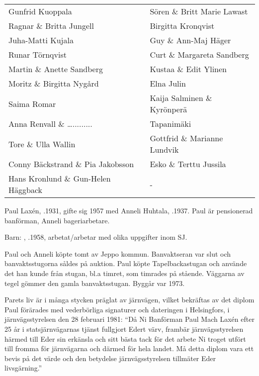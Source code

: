 \begin{center}
\begin{longtable}{l l}
    Gunfrid Kuoppala & Sören \& Britt Marie Lawast \\
    Ragnar \& Britta Jungell & Birgitta Kronqvist \\
    Juha-Matti Kujala & Guy \& Ann-Maj Häger \\
    Runar Törnqvist & Curt \& Margareta Sandberg \\
    Martin \& Anette Sandberg & Kustaa \& Edit Ylinen \\
    Moritz \& Birgitta Nygård & Elna Julin \\
    Saima Romar & Kaija Salminen \& Kyrönperä \\
    Anna Renvall \& …......... & Tapanimäki \\
    Tore \& Ulla Wallin & Gottfrid \& Marianne Lundvik \\
    Conny Bäckstrand \& Pia Jakobsson & Esko \& Terttu Jussila \\
    Hans Kronlund \& Gun-Helen Häggback & - \\
    \hline
  \end{longtable}
\end{center}






Paul Laxén, .1931, gifte sig 1957 med Anneli Huhtala, .1937. Paul är pensionerad banförman, Anneli bageriarbetare.

Barn: , .1958, arbetat/arbetar med olika uppgifter inom SJ.

Paul och Anneli köpte tomt av Jeppo kommun. Banvaktseran var slut och banvaktsstugorna såldes på auktion. Paul köpte Tapelbackastugan och använde det han kunde från stugan, bl.a timret, som timrades på stående. Väggarna av tegel gömmer den gamla banvaktsstugan. Byggår var 1973.

Parets liv är i många stycken präglat av järnvägen, vilket bekräftas av det diplom Paul förärades med vederbörliga signaturer och dateringen i Helsingfors, i järnvägsstyrelsen den 28 februari 1981: ``Då Ni Banförman Paul Mach Laxén efter 25 år i statsjärnvägarnas tjänst fullgjort Edert värv, frambär järnvägsstyrelsen härmed till Eder sin erkänsla och sitt bästa tack för det arbete Ni troget utfört till fromma för järnvägarna och därmed för hela landet. Må detta diplom vara ett bevis på det värde och den betydelse järnvägsstyrelsen tillmäter Eder livsgärning.''

